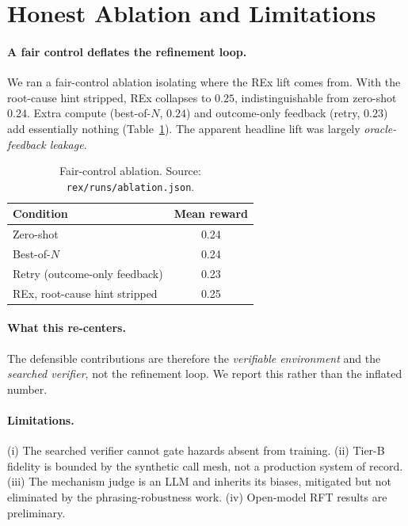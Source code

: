 \section{Honest Ablation and Limitations}
\label{sec:ablation}

\paragraph{A fair control deflates the refinement loop.}
We ran a fair-control ablation isolating where the REx lift comes from. With the root-cause
hint stripped, REx collapses to \(0.25\), indistinguishable from zero-shot \(0.24\). Extra
compute (best-of-\(N\), \(0.24\)) and outcome-only feedback (retry, \(0.23\)) add essentially
nothing (Table~\ref{tab:ablation}). The apparent headline lift was largely
\emph{oracle-feedback leakage}.

\begin{table}[t]
\centering
\begin{tabular}{lc}
\toprule
Condition & Mean reward \\
\midrule
Zero-shot                       & 0.24 \\
Best-of-$N$                     & 0.24 \\
Retry (outcome-only feedback)   & 0.23 \\
REx, root-cause hint stripped   & 0.25 \\
\bottomrule
\end{tabular}
\caption{Fair-control ablation. Source: \texttt{rex/runs/ablation.json}.}
\label{tab:ablation}
\end{table}

\paragraph{What this re-centers.}
The defensible contributions are therefore the \emph{verifiable environment} and the
\emph{searched verifier}, not the refinement loop. We report this rather than the inflated
number.

\paragraph{Limitations.}
(i) The searched verifier cannot gate hazards absent from training. (ii) Tier-B fidelity is
bounded by the synthetic call mesh, not a production system of record. (iii) The mechanism
judge is an LLM and inherits its biases, mitigated but not eliminated by the
phrasing-robustness work. (iv) Open-model RFT results are preliminary.
